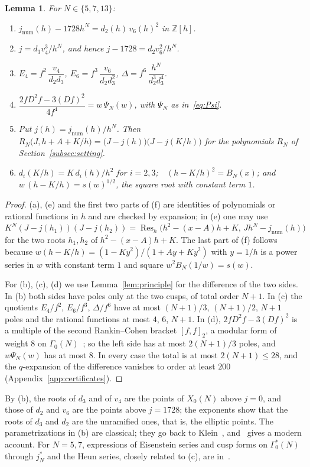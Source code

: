 \documentclass[11pt,a4paper]{article}
\newtheorem{lemma}[theorem]{Lemma}
\theoremstyle{definition}
\theoremstyle{remark}
\newcommand{\Z}{\mathbb{Z}}
\newcommand{\Res}{\operatorname{Res}}
\numberwithin{equation}{section}
\begin{document}
\begin{lemma}\label{lem:ids}
For $N\in\{5,7,13\}$:
\begin{enumerate}
\item[(a)] $j_{\mathrm{num}}(h)-1728h^N=d_2(h)\,v_6(h)^2$ in $\Z[h]$.
\item[(b)] $j=d_3v_4^3/h^N$, and hence $j-1728=d_2v_6^2/h^N$.
\item[(c)] $E_4=f^2\,\dfrac{v_4}{d_2d_3}$,\quad
$E_6=f^3\,\dfrac{v_6}{d_2d_3^2}$,\quad
$\Delta=f^6\,\dfrac{h^N}{d_2^3d_3^4}$.
\item[(d)] $\dfrac{2fD^2f-3(Df)^2}{4f^4}=w\,\Psi_N(w)$, with $\Psi_N$ as
in~\eqref{eq:Psi}.
\item[(e)] Put $j(h)=j_{\mathrm{num}}(h)/h^N$. Then
$R_N\bigl(J,h+A+K/h\bigr)=\bigl(J-j(h)\bigr)\bigl(J-j(K/h)\bigr)$ for the
polynomials $R_N$ of Section~\ref{subsec:setting}.
\item[(f)] $d_i(K/h)=K\,d_i(h)/h^2$ for $i=2,3$;\ \ $(h-K/h)^2=B_N(x)$; and
$w\,(h-K/h)=s(w)^{1/2}$, the square root with constant term $1$.
\end{enumerate}
\end{lemma}
\begin{proof}
(a), (e) and the first two parts of (f) are identities of polynomials or
rational functions in $h$ and are checked by expansion; in (e) one may use
$K^N(J-j(h_1))(J-j(h_2))=\Res_h\bigl(h^2-(x-A)h+K,\,Jh^N-j_{\mathrm{num}}(h)\bigr)$
for the two roots $h_1,h_2$ of $h^2-(x-A)h+K$. The last part of (f) follows
because $w(h-K/h)=(1-Ky^2)/(1+Ay+Ky^2)$ with $y=1/h$ is a power series in $w$
with constant term $1$ and square $w^2B_N(1/w)=s(w)$.

For (b), (c), (d) we use Lemma~\ref{lem:principle} for the difference of the
two sides. In (b) both sides have poles only at the two cusps, of total order
$N+1$. In (c) the quotients $E_4/f^2$, $E_6/f^3$, $\Delta/f^6$ have at most
$(N+1)/3$, $(N+1)/2$, $N+1$ poles and the rational functions at most $4$, $6$,
$N+1$. In (d), $2fD^2f-3(Df)^2$ is a multiple of the second Rankin--Cohen
bracket $[f,f]_2$, a modular form of weight $8$ on
$\Gamma_0(N)$~\cite[\S5.2]{Zagier}; so the left side has at most $2(N+1)/3$
poles, and $w\Psi_N(w)$ has at most $8$. In every case the total is at most
$2(N+1)\le28$, and the $q$-expansion of the difference vanishes to order
at least $200$ (Appendix~\ref{app:certificates}).
\end{proof}

By (b), the roots of $d_3$ and of $v_4$ are the points of $X_0(N)$ above
$j=0$, and those of $d_2$ and $v_6$ are the points above $j=1728$; the
exponents show that the roots of $d_3$ and $d_2$ are the unramified ones,
that is, the elliptic points. The parametrizations in (b) are classical; they
go back to Klein~\cite{Klein}, and~\cite{Maier} gives a modern account. For
$N=5,7$, expressions of Eisenstein series and cusp forms on $\Gamma_0^*(N)$
through $j_N^*$ and the Heun series, closely related to (c), are
in~\cite[Remark~3.2]{Sakai14}.
\end{document}
